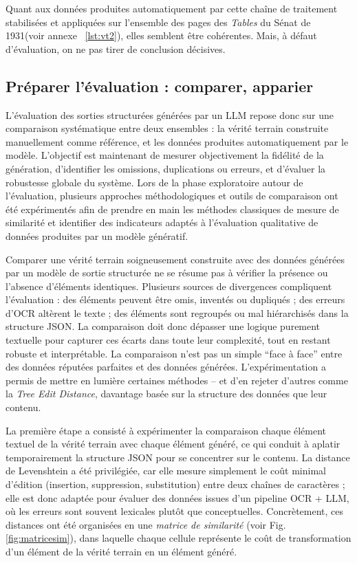 Quant aux données produites automatiquement par cette chaîne de traitement stabilisées et appliquées sur l'ensemble des pages des \emph{Tables} du Sénat de 1931(voir annexe ~\ref{lst:vt2}), elles semblent être cohérentes. Mais, à défaut d'évaluation, on ne pas tirer de conclusion décisives.

\subsection{Préparer l'évaluation : comparer, apparier}

L’évaluation des sorties structurées générées par un LLM repose donc sur une comparaison systématique entre deux ensembles : la vérité terrain construite manuellement comme référence, et les données produites automatiquement par le modèle. L’objectif est maintenant de mesurer objectivement la fidélité de la génération, d’identifier les omissions, duplications ou erreurs, et d’évaluer la robustesse globale du système. Lors de la phase exploratoire autour de l'évaluation, plusieurs approches méthodologiques et outils de comparaison ont été expérimentés afin de prendre en main les méthodes classiques de mesure de similarité et identifier des indicateurs adaptés à l’évaluation qualitative de données produites par un modèle génératif. 

Comparer une vérité terrain soigneusement construite avec des données générées par un modèle de sortie structurée ne se résume pas à vérifier la présence ou l’absence d’éléments identiques. Plusieurs sources de divergences compliquent l’évaluation : des éléments peuvent être omis, inventés ou dupliqués ; des erreurs d’OCR altèrent le texte ; des éléments sont regroupés ou mal hiérarchisés dans la structure JSON. La comparaison doit donc dépasser une logique purement textuelle pour capturer ces écarts dans toute leur complexité, tout en restant robuste et interprétable. La comparaison n'est pas un simple \enquote{face à face} entre des données réputées parfaites et des données générées. L'expérimentation a permis de mettre en lumière certaines méthodes -- et d'en rejeter d'autres comme la \emph{Tree Edit Distance}, davantage basée sur la structure des données que leur contenu.

La première étape a consisté à expérimenter la comparaison chaque élément textuel de la vérité terrain avec chaque élément généré, ce qui conduit à aplatir temporairement la structure JSON pour se concentrer sur le contenu. La distance de Levenshtein a été privilégiée, car elle mesure simplement le coût minimal d’édition (insertion, suppression, substitution) entre deux chaînes de caractères ; elle est donc adaptée pour évaluer des données issues d’un pipeline OCR + LLM, où les erreurs sont souvent lexicales plutôt que conceptuelles. Concrètement, ces distances ont été organisées en une \emph{matrice de similarité} (voir Fig. \ref{fig:matricesim}), dans laquelle chaque cellule représente le coût de transformation d’un élément de la vérité terrain en un élément généré. 

